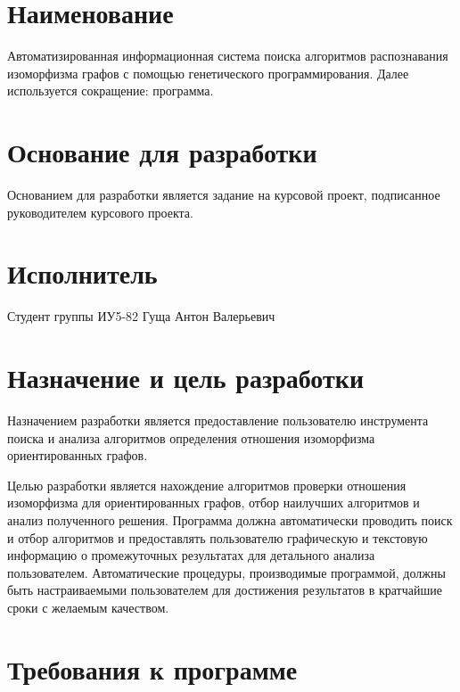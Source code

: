 \documentclass[russian,utf8,emptystyle]{eskdtext}
\begin{document}
\maketitle
\tableofcontents
\newpage

\section{Наименование}
Автоматизированная информационная система поиска алгоритмов распознавания изоморфизма графов с помощью генетического программирования. Далее используется сокращение: программа.

\section{Основание для разработки}
Основанием для разработки является задание на курсовой проект, подписанное руководителем курсового проекта.

\section{Исполнитель}
Студент группы ИУ5-82 Гуща Антон Валерьевич

\section{Назначение и цель разработки}
Назначением разработки является предоставление пользователю инструмента поиска и анализа алгоритмов определения отношения изоморфизма ориентированных графов. 

Целью разработки является нахождение алгоритмов проверки отношения изоморфизма для ориентированных графов, отбор наилучших алгоритмов и анализ полученного решения. Программа должна автоматически проводить поиск и отбор алгоритмов и предоставлять пользователю графическую и текстовую информацию о промежуточных результатах для детального анализа пользователем. Автоматические процедуры, производимые программой, должны быть настраиваемыми пользователем для достижения результатов в кратчайшие сроки с желаемым качеством.

\section{Требования к программе}
\end{document}
